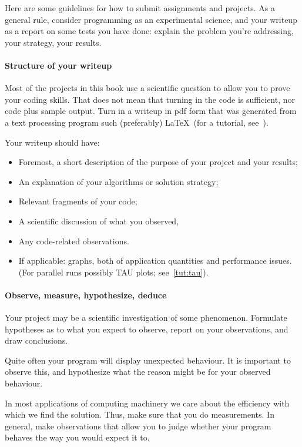 Here are some guidelines for how to submit assignments and projects.
As a general rule, consider programming as an experimental science,
and your writeup as a report on some tests you have done: explain
the problem you're addressing, your strategy, your results.

\paragraph*{\bf Structure of your writeup}

Most of the projects in this book use a scientific question to allow
you to prove your coding skills.
That does not mean that turning in the code is sufficient, nor code plus sample output.
Turn in a writeup in pdf form that was generated from a text
processing program such 
(preferably) \LaTeX\ (for a tutorial, see~).

Your writeup should have:
\begin{itemize}
\item Foremost, a short description of the purpose of your project and your results;
\item An explanation of your algorithms or solution strategy;
\item Relevant fragments of your code;
\item A scientific discussion of what you observed,
\item Any code-related observations.
\item If applicable: graphs, both of application quantities and
performance issues.
(For parallel runs possibly TAU plots; see~\ref{tut:tau}).
\end{itemize}

\paragraph*{Observe, measure, hypothesize, deduce}

Your project may be a scientific investigation of some
phenomenon. Formulate hypotheses as to what you expect to observe,
report on your observations, and draw conclusions.

Quite often your program will display unexpected behaviour. It is important to observe
this, and hypothesize what the reason might be for your observed behaviour.

In most applications of computing machinery we care about the efficiency with which
we find the solution. Thus, make sure that you do measurements. In general, make
observations that allow you to judge whether your program behaves the way you
would expect it to.

